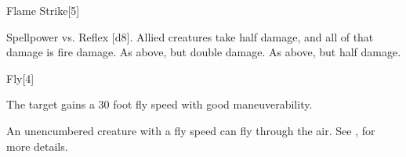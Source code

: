 \begin{spellsection}{Flame Strike}[5]
    \begin{spellheader}
    \end{spellheader}
    \begin{spellcontent}
        \begin{spelltargetinginfo}
        \end{spelltargetinginfo}
        \begin{spelleffects}
            \begin{spellattack}{Spellpower vs. Reflex}
                \spellsuccess {}[d8]. Allied creatures take half damage, and all of that damage is fire damage.
                \spellcritical As above, but double damage.
                \spellfailure As above, but half damage.
            \end{spellattack}
        \end{spelleffects}
    \end{spellcontent}
    \begin{spellfooter}
        \spellnotes \destructivespellnotes

        \firespellnotes
        \miscastyou
    \end{spellfooter}
\end{spellsection}

\begin{spellsection}{Fly}[4]
    \begin{spellheader}
    \end{spellheader}
    \begin{spellcontent}
        \begin{spelltargetinginfo}
        \end{spelltargetinginfo}
        \begin{spelleffects}
            \spelleffect The target gains a 30 foot fly speed with good maneuverability.
            \spelldur \durshort
        \end{spelleffects}
    \end{spellcontent}
    \begin{spellfooter}
        \spellnotes An unencumbered creature with a fly speed can fly through the air. See , for more details.
        \miscastexplode
    \end{spellfooter}
    \begin{spellaugments}
    \end{spellaugments}
\end{spellsection}

